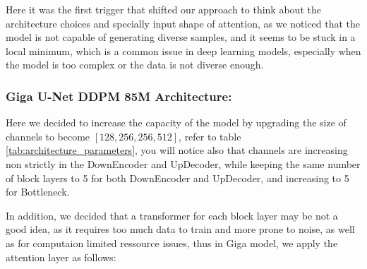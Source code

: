 \documentclass[twocolumn,superscriptaddress,aps]{revtex4-1}
\begin{document}
Here it was the first trigger that shifted our approach to think about the architecture choices and specially input shape of attention, as we noticed that the model is not capable of generating diverse samples, and it seems to be stuck in a local minimum, which is a common issue in deep learning models, especially when the model is too complex or the data is not diverse enough.




\subsubsection{Giga U-Net DDPM 85M Architecture:}
Here we decided to increase the capacity of the model by upgrading the size of channels to become $[128, 256, 256, 512]$, refer to table \ref{tab:architecture_parameters}, you will notice also that channels are increasing non strictly in the DownEncoder and UpDecoder, while keeping the same number of block layers to 5 for both DownEncoder and UpDecoder, and increasing to 5 for Bottleneck.

In addition, we decided that a transformer for each block layer may be not a good idea, as it requires too much data to train and more prone to noise, as well as for computaion limited ressource issues, thus in Giga model, we apply the attention layer as follows:
\end{document}
